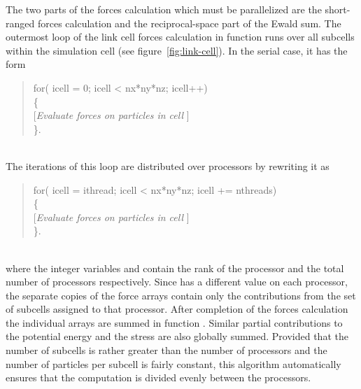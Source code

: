 \documentclass[a4paper,twoside]{report}
\begin{document}
The two parts of the forces calculation which must be parallelized are
the short-ranged forces calculation and the reciprocal-space part of
the Ewald sum.  The outermost loop of the link cell forces calculation
in function  runs over all subcells within the
simulation cell (see figure~\ref{fig:link-cell}).  In the serial case, 
it has the form\\
\parbox{\textwidth}{%
\begin{quote}
  \Litf
  for( icell = 0; icell < nx*ny*nz; icell++)\\
  \{\\
  \hspace*{1cm}\textnormal{[\emph{Evaluate forces on particles in cell}
  ]}\\ 
    \}.
\end{quote}}\\
The iterations of this loop are distributed over processors by
rewriting it as\\
\parbox{\textwidth}{%
\begin{quote}
  \Litf
  for( icell = ithread; icell < nx*ny*nz; icell += nthreads)\\
  \{\\
  \hspace*{1cm}\textnormal{[\emph{Evaluate forces on particles in cell}
  ]}\\ 
    \}.
\end{quote}}\\
where the integer variables  and  contain
the rank of the processor and the total number of processors
respectively. Since  has a different value on each
processor, the separate copies of the force arrays contain only the
contributions from the set of subcells assigned to that processor.
After completion of the forces calculation the individual arrays are
summed in function .  Similar partial contributions to
the potential energy and the stress are also globally summed.
Provided that the number of subcells is rather greater than the number
of processors and the number of particles per subcell is fairly
constant, this algorithm automatically ensures that the computation is
divided evenly between the processors.
\end{document}
